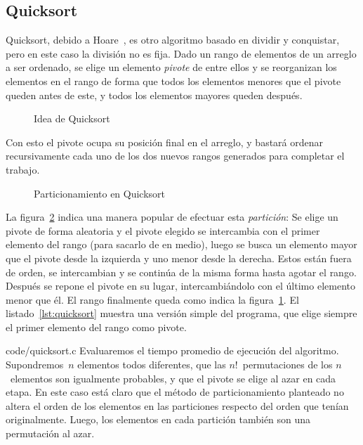 %

\subsection{Quicksort}
\label{sec:quicksort}

  Quicksort,
  debido a Hoare~\cite{hoare62:_quicksort},
  es otro algoritmo basado en dividir y conquistar,
  pero en este caso la división no es fija.
  Dado un rango de elementos de un arreglo a ser ordenado,
  se elige un elemento \emph{pivote} de entre ellos
  y se reorganizan los elementos en el rango
  de forma que todos los elementos menores que el pivote
  queden antes de este,
  y todos los elementos mayores queden después.
  \begin{figure}[htbp]
    \centering
    \caption{Idea de Quicksort}
    \label{fig:qsort:idea}
  \end{figure}
  Con esto el pivote ocupa su posición final en el arreglo,
  y bastará ordenar recursivamente cada uno
  de los dos nuevos rangos generados
  para completar el trabajo.
  \begin{figure}[htbp]
    \centering
    \caption{Particionamiento en Quicksort}
    \label{fig:qsort:particionamiento}
  \end{figure}
  La figura~\ref{fig:qsort:particionamiento} indica una manera popular
  de efectuar esta \emph{partición}:
  Se elige un pivote de forma aleatoria
  y el pivote elegido se intercambia con el primer elemento del rango
  (para sacarlo de en medio),
  luego se busca un elemento mayor que el pivote desde la izquierda
  y uno menor desde la derecha.
  Estos están fuera de orden,
  se intercambian y se continúa de la misma forma hasta agotar el rango.
  Después se repone el pivote en su lugar,
  intercambiándolo con el último elemento menor que él.
  El rango finalmente queda como indica la figura~\ref{fig:qsort:idea}.
  El listado~\ref{lst:quicksort} muestra una versión simple del programa,
  que elige siempre el primer elemento del rango como pivote.
  
		   {code/quicksort.c}
  Evaluaremos el tiempo promedio de ejecución del algoritmo.%
  Supondremos~\(n\) elementos todos diferentes,
  que las \(n!\)~permutaciones de los \(n\)~elementos
  son igualmente probables,
  y que el pivote se elige al azar en cada etapa.
  En este caso está claro que el método de particionamiento planteado
  no altera el orden de los elementos en las particiones
  respecto del orden que tenían originalmente.
  Luego,
  los elementos en cada partición también son una permutación al azar.

